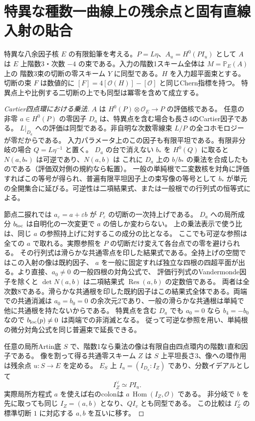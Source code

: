 \section{特異な種数一曲線上の残余点と固有直線入射の貼合}
\label{sec:singular-residual-gluing}
\begin{theorem}\label{thm:singular-residual-gluing}
特異な八余因子核 $E$ の有限鉛筆を考える。$P=L\eta$、$A_u=H^0(P I_u)$ として
$A$ は $E$ 上階数3・次数 $-4$ の束である。入力の階数1スキーム全体は $M=\mathbb P_E(A)$ 上の
階数3束の切断の零スキーム $Y$ に同型である。$H$ を入力超平面束とする。
切断の束 $F$ は数値的に $[F]=4[\mathcal O(H)]-[\mathcal O]$ と同じChern指標を持つ。
特異点上や比例する二切断の上でも同型は冪零を含めて成立する。
\end{theorem}
\begin{proof}[Cartier四点環における乗法]
$A$ は $H^0(P)\otimes\mathcal O_E\to P$ の評価核である。
任意の非零 $a\in H^0(P)$ の零因子 $D_a$ は、特異点を含む場合も長さ4のCartier因子である。
$L|_{D_a}$ への評価は同型である。非自明な次数零線束 $L/P$ の全コホモロジーが零だからである。
入力パラメータ上のこの因子も有限平坦である。有限非分岐の場合 $Q=L\eta^{-1}$ と置く。
$D_a$ の台で消えない $b_*$ を $H^0(Q)$ に取ると $N(a,b_*)$ は可逆であり、$N(a,b)$ は
これに $D_a$ 上の $b/b_*$ の乗法を合成したものである（評価双対側の規約なら転置）。
一般の単純根で二変数核を対角に評価すればこの等号が得られ、普遍有限平坦因子上の束写像の等号として
$b_*$ が単元の全開集合に延びる。可逆性は二項結果式、または一般根での行列式の恒等式による。

節点二捩れでは $a_\varepsilon=a+\varepsilon b$ が $P_\varepsilon$ の切断の一次持上げである。
$D_a$ への局所成分 $b_{\rm loc}$ は自明化の一次変更で $a$ の倍しか変わらない。
上の乗法表示で使う比は、同じ $a$ の参照持上げに対するこの成分の比となる。
ここでも可逆な参照は全ての $a$ で取れる。実際参照を $P$ の切断だけ変えて各台点での零を避けられる。
その行列式は滑らかな共通零点を印した結果式である。全持上げの空間ではこの入射の像は既約因子、
$a$ を一般に固定すれば独立な四根の四超平面が出る。より直接、$a_0\ne0$ の一般四根の対角公式で、
評価行列式のVandermonde因子を除くと $\det N(a,b)$ は二項結果式 $\operatorname{Res}(a,b)$ の定数倍である。
両者は全次数8である。滑らかな共通根を印した既約因子はこの結果式全体である。両端での共通消滅は
$a_0=b_0=0$ の余次元2であり、一般の滑らかな共通根は単純で他に共通根を持たないからである。
特異点を含む $D_a$ でも $a_0=0$ なら $b_4=-b_0$ なので $b_{\rm loc}(p)\ne0$ は両端での非消滅となる。
従って可逆な参照を用い、単純根の微分対角公式を同じ普遍束で延長できる。

任意の局所Artin底 $S$ で、階数1なら乗法の像は有限自由四点環内の階数1直和因子である。
像を割って得る共通零スキーム $Z$ は $S$ 上平坦長さ3、像への環作用は残余点 $u:S\to E$ を定める。
$E_S$ 上 $I_u=(I_{D_a}:I_Z)$ であり、分数イデアルとして
\[
                           I_Z^\vee\simeq P I_u .
\]
実際局所方程式 $a$ を使えば右のcolonは $a\,\operatorname{Hom}(I_Z,\mathcal O)$ である。
非分岐で $b$ を先に取っても同じ $I_Z=(a,b)$ となり、$Q I_v$ とも同型である。
この比較は $I_Z^\vee$ の標準切断 $1$ に対応する $a,b$ を互いに移す。
\end{proof}

